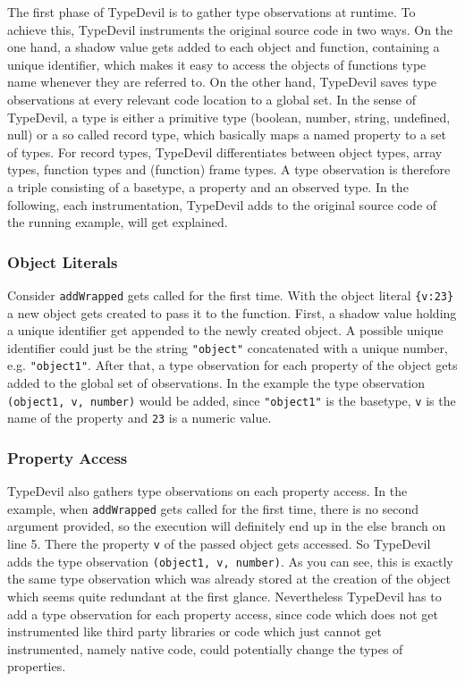\documentclass[runningheads,a4paper]{llncs}
\begin{document}
The first phase of TypeDevil is to gather type observations at runtime.
To achieve this, TypeDevil instruments the original source code in two ways.
On the one hand, a shadow value gets added to each object and function, containing a unique identifier, which makes it easy to access the objects of functions type name whenever they are referred to. 
On the other hand, TypeDevil saves type observations at every relevant code location to a global set.
In the sense of TypeDevil, a type is either a primitive type (boolean, number, string, undefined, null) or a so called record type, which basically maps a named property to a set of types.
For record types, TypeDevil differentiates between object types, array types, function types and (function) frame types.
A type observation is therefore a triple consisting of a basetype, a property and an observed type.
In the following, each instrumentation, TypeDevil adds to the original source code of the running example, will get explained.

\subsubsection{Object Literals}
Consider \lstinline[columns=fixed]{addWrapped} gets called for the first time.
With the object literal \lstinline[columns=fixed]!{v:23}! a new object gets created to pass it to the function.
First, a shadow value holding a unique identifier get appended to the newly created object. A possible unique identifier could just be the string \lstinline[columns=fixed]{"object"} concatenated with a unique number, e.g. \lstinline[columns=fixed]{"object1"}.
After that, a type observation for each property of the object gets added to the global set of observations.
In the example the type observation \lstinline[columns=fixed]{(object1, v, number)} would be added, since \lstinline[columns=fixed]{"object1"} is the basetype, \lstinline[columns=fixed]{v} is the name of the property and \lstinline[columns=fixed]{23} is a numeric value.

\subsubsection{Property Access}
TypeDevil also gathers type observations on each property access.
In the example, when \lstinline[columns=fixed]{addWrapped} gets called for the first time, there is no second argument provided, so the execution will definitely end up in the else branch on line 5. 
There the property \lstinline[columns=fixed]{v} of the passed object gets accessed.
So TypeDevil adds the type observation \lstinline[columns=fixed]{(object1, v, number)}.
As you can see, this is exactly the same type observation which was already stored at the creation of the object which seems quite redundant at the first glance. 
Nevertheless TypeDevil has to add a type observation for each property access, since code which does not get instrumented like third party libraries or code which just cannot get instrumented, namely native code, could potentially change the types of properties.
\end{document}
